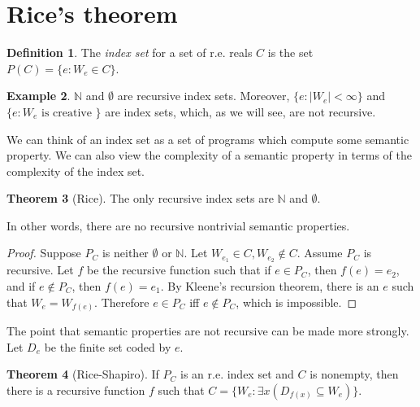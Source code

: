 \documentclass[12pt]{report}
\newcommand{\NN}{\mathbb{N}}
\newcommand{\dfn}[1]{\emph{#1}\index{#1}}
\theoremstyle{definition}
\newtheorem{theorem}{Theorem}[chapter]
\newtheorem{definition}[theorem]{Definition}
\newtheorem{example}[theorem]{Example}
\begin{document}
\section{Rice's theorem}
\begin{definition}
The \dfn{index set} for a set of r.e. reals $C$ is the set $P(C) = \{e: W_e \in C\}$.
\end{definition}
\begin{example}
$\NN$ and $\emptyset$ are recursive index sets. Moreover, $\{e: |W_e| < \infty\}$ and $\{e: W_e \text{ is creative }\}$ are index sets, which, as we will see, are not recursive.
\end{example}
We can think of an index set as a set of programs which compute some semantic property. We can also view the complexity of a semantic property in terms of the complexity of the index set.
\begin{theorem}[Rice]
The only recursive index sets are $\NN$ and $\emptyset$.
\end{theorem}
In other words, there are no recursive nontrivial semantic properties.
\begin{proof}
Suppose $P_C$ is neither $\emptyset$ or $\NN$. Let $W_{e_1} \in C, W_{e_2} \notin C$. Assume $P_C$ is recursive.
Let $f$ be the recursive function such that if $e \in P_C$, then $f(e) = e_2$, and if $e \notin P_C$, then $f(e) = e_1$.
By Kleene's recursion theorem, there is an $e$ such that $W_e = W_{f(e)}$. Therefore $e \in P_C$ iff $e \notin P_C$, which is impossible.
\end{proof}
The point that semantic properties are not recursive can be made more strongly. Let $D_e$ be the finite set coded by $e$.
\begin{theorem}[Rice-Shapiro]
If $P_C$ is an r.e. index set and $C$ is nonempty, then there is a recursive function $f$ such that $C = \{W_e: \exists x(D_{f(x)} \subseteq W_e)\}$.
\end{theorem}
\end{document}
